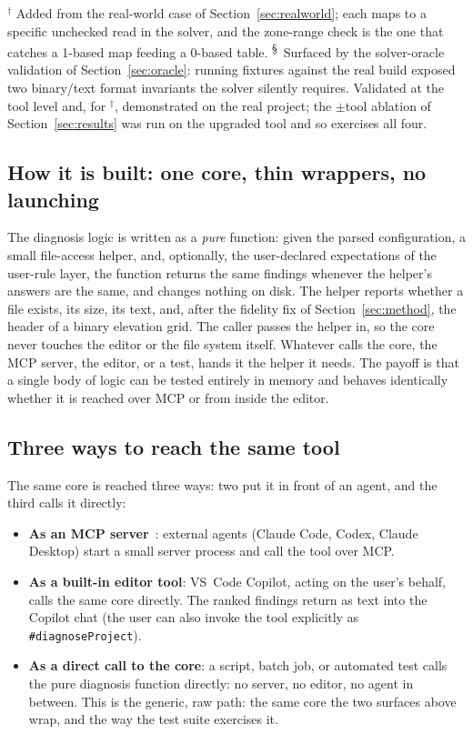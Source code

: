 \documentclass[conference]{IEEEtran}
\begin{document}
\begin{table}[!t]
\smallskip
{\footnotesize $^\dagger$ Added from the real-world case of Section~\ref{sec:realworld};
each maps to a specific unchecked read in the solver, and the zone-range check is the one that
catches a 1-based map feeding a 0-based table. \textsuperscript{\S}~Surfaced by the solver-oracle
validation of Section~\ref{sec:oracle}: running fixtures against the real build exposed two
binary/text format invariants the solver silently requires. Validated at the tool level and,
for $^\dagger$, demonstrated on the real project; the $\pm$tool ablation of Section~\ref{sec:results} was run
on the upgraded tool and so exercises all four.}
\end{table}

\subsection{How it is built: one core, thin wrappers, no launching}
The diagnosis logic is written as a \emph{pure} function: given the parsed configuration, a
small file-access helper, and, optionally, the user-declared expectations of the user-rule
layer, the function returns the same findings whenever the helper's answers are the same, and
changes nothing on disk. The helper reports whether a file exists, its size, its text, and, after the fidelity fix
of Section~\ref{sec:method}, the header of a binary elevation grid. The caller passes the helper
in, so the core never touches the editor or the file system itself. Whatever calls the core, the
MCP server, the editor, or a test, hands it the helper it needs. The payoff is that
a single body of logic can be tested entirely in memory and behaves identically whether it is
reached over MCP or from inside the editor.

\subsection{Three ways to reach the same tool}
The same core is reached three ways: two put it in front of an agent, and the third calls it directly:
\begin{itemize}
  \item \textbf{As an MCP server}~\cite{mcp}: external agents (Claude Code, Codex, Claude Desktop)
        start a small server process and call the tool over MCP.
  \item \textbf{As a built-in editor tool}: VS~Code Copilot, acting on the user's behalf, calls the
        same core directly. The
        ranked findings return as text into the Copilot chat (the user can also invoke the tool
        explicitly as \texttt{\#diagnoseProject}).
  \item \textbf{As a direct call to the core}: a script, batch job, or automated test calls the pure
        diagnosis function directly: no server, no editor, no agent in between. This is the generic,
        raw path: the same core the two surfaces above wrap, and the way the test suite exercises it.
\end{itemize}
\end{document}
